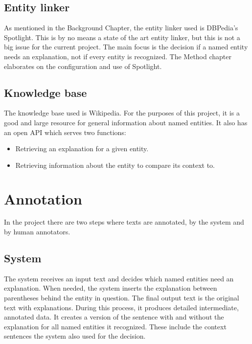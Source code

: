 \documentclass[
10pt, %
a4paper, %
oneside, %
headinclude,footinclude, %
] {book}%
\begin{document}
\subsection{Entity linker}
As mentioned in the Background Chapter, the entity linker used is DBPedia's Spotlight.
This is by no means a state of the art entity linker, but this is not a big issue for the current project.
The main focus is the decision if a named entity needs an explanation, not if every entity is recognized.
The Method chapter elaborates on the configuration and use of Spotlight.

\subsection{Knowledge base}
The knowledge base used is Wikipedia.
For the purposes of this project, it is a good and large resource for general information about named entities.
It also has an open API which serves two functions:

\begin{itemize}
  \item Retrieving an explanation for a given entity.
  \item Retrieving information about the entity to compare its context to.
\end{itemize}
\newpage

\section{Annotation}
In the project there are two steps where texts are annotated, by the system and by human annotators.

\subsection{System}
The system receives an input text and decides which named entities need an explanation.
When needed, the system inserts the explanation between parentheses behind the entity in question.
The final output text is the original text with explanations.
During this process, it produces detailed intermediate, annotated data.
It creates a version of the sentence with and without the explanation for all named entities it recognized.
These include the context sentences the system also used for the decision.
\end{document}
